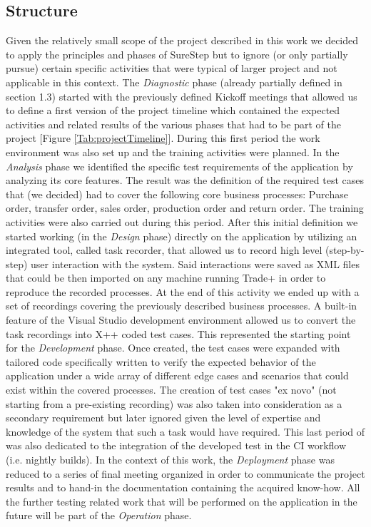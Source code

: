 \subsection{Structure}

Given the relatively small scope of the project described in this work we decided to apply the principles and phases of SureStep but to ignore (or only partially pursue) certain specific activities that were typical of larger project and not applicable in this context. 
The \textit{Diagnostic} phase (already partially defined in section 1.3) started with the previously defined Kickoff meetings that allowed us to define a first version of the project timeline which contained the expected activities and related results of the various phases that had to be part of the project [Figure \ref{Tab:projectTimeline}].  During this first period the work environment was also set up and the training activities were planned.
In the \textit{Analysis} phase we identified the specific test requirements of the application by analyzing its core features. The result was the definition of the required test cases that (we decided) had to cover the following core business processes: Purchase order, transfer order, sales order, production order and return order. The training activities were also carried out during this period. 
After this initial definition we started working (in the \textit{Design} phase) directly on the application by utilizing an integrated tool, called task recorder, that allowed us to record high level (step-by-step) user interaction with the system. Said interactions were saved as XML files that could be then imported on any machine running Trade+ in order to reproduce the recorded processes. At the end of this activity we ended up with a set of recordings covering the previously described business processes. 
A built-in feature of the Visual Studio development environment allowed us to convert the task recordings into X++ coded test cases. This represented the starting point for the \textit{Development} phase. Once created, the test cases were expanded with tailored code specifically written to verify the expected behavior of the application under a wide array of different edge cases and scenarios that could exist within the covered processes. The creation of test cases "ex novo" (not starting from a pre-existing recording) was also taken into consideration as a secondary requirement but later ignored given the level of expertise and knowledge of the system that such a task would have required. This last period of was also dedicated to the integration of the developed test in the CI workflow (i.e. nightly builds). 
In the context of this work, the \textit{Deployment} phase was reduced to a series of final meeting organized in order to communicate the project results and to hand-in the documentation containing the acquired know-how. 
All the further testing related work that will be performed on the application in the future will be part of the \textit{Operation} phase.

